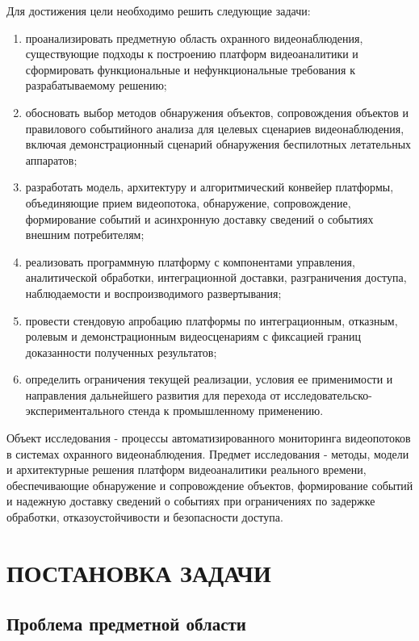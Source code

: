Для достижения цели необходимо решить следующие задачи:
\begin{enumerate}
    \item проанализировать предметную область охранного видеонаблюдения, существующие подходы к построению платформ видеоаналитики и сформировать функциональные и нефункциональные требования к разрабатываемому решению;
    \item обосновать выбор методов обнаружения объектов, сопровождения объектов и правилового событийного анализа для целевых сценариев видеонаблюдения, включая демонстрационный сценарий обнаружения беспилотных летательных аппаратов;
    \item разработать модель, архитектуру и алгоритмический конвейер платформы, объединяющие прием видеопотока, обнаружение, сопровождение, формирование событий и асинхронную доставку сведений о событиях внешним потребителям;
    \item реализовать программную платформу с компонентами управления, аналитической обработки, интеграционной доставки, разграничения доступа, наблюдаемости и воспроизводимого развертывания;
    \item провести стендовую апробацию платформы по интеграционным, отказным, ролевым и демонстрационным видеосценариям с фиксацией границ доказанности полученных результатов;
    \item определить ограничения текущей реализации, условия ее применимости и направления дальнейшего развития для перехода от исследовательско-экспериментального стенда к промышленному применению.
\end{enumerate}

Объект исследования - процессы автоматизированного мониторинга видеопотоков в системах охранного видеонаблюдения. Предмет исследования - методы, модели и архитектурные решения платформ видеоаналитики реального времени, обеспечивающие обнаружение и сопровождение объектов, формирование событий и надежную доставку сведений о событиях при ограничениях по задержке обработки, отказоустойчивости и безопасности доступа.

\chapter{ПОСТАНОВКА ЗАДАЧИ}
\label{ch:short_problem}

\section{Проблема предметной области}

